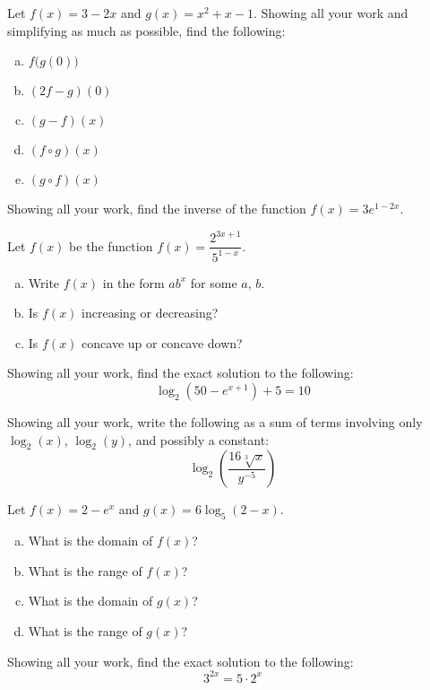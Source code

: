 \documentclass[12pt,letterpaper]{exam}
\begin{document}
\begin{questions}
\newpage
\question[10] Let $f(x)= 3 - 2x$ and $g(x)= x^2 + x - 1$. Showing all your work and simplifying as much as possible, find the following:
	\begin{enumerate}[(a)]
	\item $f \big( g(0) \big)$
	\item $(2f - g)(0)$
	\item $(g - f)(x)$
	\item $(f \circ g)(x)$
	\item $(g \circ f)(x)$
	\end{enumerate}



\newpage
\question[10] Showing all your work, find the inverse of the function $f(x)= 3e^{1 - 2x}$.



\newpage
\question[10] Let $f(x)$ be the function $f(x)= \dfrac{2^{3x + 1}}{5^{1 - x}}$.
	\begin{enumerate}[(a)]
	\item Write $f(x)$ in the form $ab^x$ for some $a$, $b$. 
	\item Is $f(x)$ increasing or decreasing?
	\item Is $f(x)$ concave up or concave down?
	\end{enumerate}



\newpage
\question[10] Showing all your work, find the exact solution to the following:
	\[
	\log_2 \left( 50 - e^{x + 1} \right) + 5= 10
	\]



\newpage
\question[10] Showing all your work, write the following as a sum of terms involving only $\log_2(x)$, $\log_2(y)$, and possibly a constant:
	\[
	\log_2 \left( \dfrac{16 \sqrt[3]{x}}{y^{-5}} \right)
	\]



\newpage
\question[10] Let $f(x)= 2 - e^x$ and $g(x)= 6 \log_5( 2 - x)$.
	\begin{enumerate}[(a)]
	\item What is the domain of $f(x)$?
	\item What is the range of $f(x)$?
	\item What is the domain of $g(x)$?
	\item What is the range of $g(x)$?
	\end{enumerate}



\newpage
\question[10] Showing all your work, find the exact solution to the following:
	\[
	3^{2x}= 5 \cdot 2^x
	\]




\end{questions}
\end{document}
